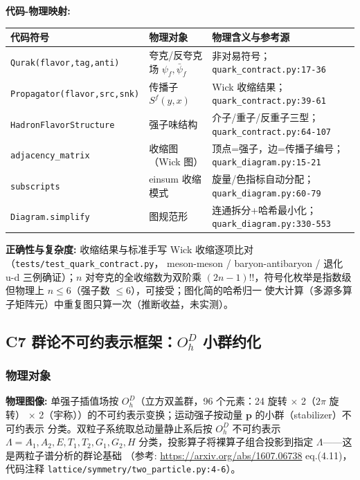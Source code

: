 \documentclass[UTF8]{ctexart}
\begin{document}
\begin{mapbox}
\textbf{代码-物理映射:}
\end{mapbox}
\begin{xltabular}{\textwidth}{llX}
\toprule
\textcolor{map}{代码符号} & 物理对象 & 物理含义与参考源 \\
\midrule
\endhead
\texttt{Qurak(flavor,tag,anti)} & 夸克/反夸克场 $\psi_f,\bar\psi_f$ & 非对易符号；
  \texttt{\nolinkurl{quark_contract.py:17-36}} \\
\texttt{Propagator(flavor,src,snk)} & 传播子 $S^f(y,x)$ & Wick 收缩结果；
  \texttt{\nolinkurl{quark_contract.py:39-61}} \\
\texttt{HadronFlavorStructure} & 强子味结构 & 介子/重子/反重子三型；
  \texttt{\nolinkurl{quark_contract.py:64-107}} \\
\texttt{adjacency\_matrix} & 收缩图（Wick 图） & 顶点=强子，边=传播子编号；
  \texttt{\nolinkurl{quark_diagram.py:15-21}} \\
\texttt{subscripts} & einsum 收缩模式 & 旋量/色指标自动分配；
  \texttt{\nolinkurl{quark_diagram.py:60-79}} \\
\texttt{Diagram.simplify} & 图规范形 & 连通拆分+哈希最小化；
  \texttt{\nolinkurl{quark_diagram.py:330-553}} \\
\bottomrule
\end{xltabular}

\textbf{正确性与复杂度:} 收缩结果与标准手写 Wick 收缩逐项比对（\texttt{tests/test\_quark\_contract.py}，
meson-meson / baryon-antibaryon / 退化 u-d 三例确证）；$n$ 对夸克的全收缩数为双阶乘
$(2n-1)!!$，符号化枚举是指数级但物理上 $n\le 6$（强子数 $\le 6$），可接受；图化简的哈希归一
使大计算（多源多算子矩阵元）中重复图只算一次（推断收益，未实测）。

\subsection{C7 群论不可约表示框架：$O_h^D$ 小群约化}
\label{sec:c7}

\subsubsection{物理对象}
\begin{physbox}
\textbf{物理图像:} 单强子插值场按 $O_h^D$（立方双盖群，96 个元素：24 旋转 $\times$ 2（$2\pi$ 旋转）
$\times$ 2（宇称））的不可约表示变换；运动强子按动量 $\mathbf p$ 的小群（stabilizer）不可约表示
分类。双粒子系统取总动量静止系后按 $O_h^D$ 不可约表示 $\Lambda = A_1, A_2, E, T_1, T_2, G_1, G_2, H$
分类，投影算子将裸算子组合投影到指定 $\Lambda$——这是两粒子谱分析的群论基础
（参考: \url{https://arxiv.org/abs/1607.06738} eq.(4.11)，代码注释
\texttt{lattice/symmetry/two\_particle.py:4-6}）。
\end{physbox}
\end{document}
